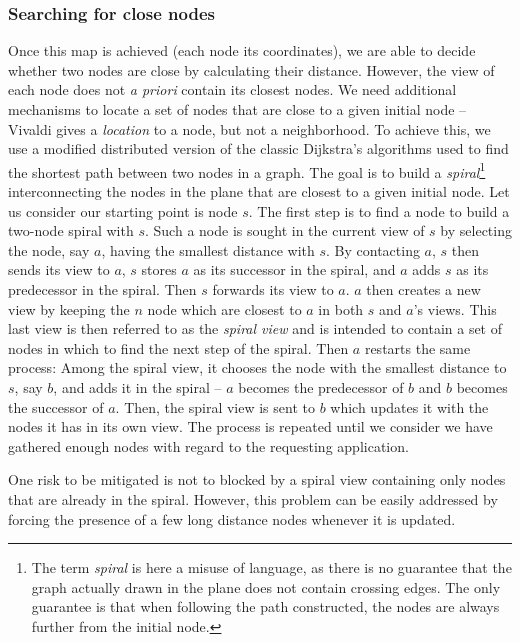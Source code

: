 \subsubsection*{Searching for close nodes}

Once this map is achieved (each node its coordinates), we are able to decide
whether two nodes are close by calculating their distance. However, the view of
each node does not \emph{a priori} contain its closest nodes. We need additional
mechanisms to locate a set of nodes that are close to a given initial node --
Vivaldi gives a \emph{location} to a node, but not a neighborhood. To achieve
this, we use a modified distributed version of the classic Dijkstra's algorithms
used to find the shortest path between two nodes in a graph. The goal is to
build a \emph{spiral}\footnote{The term \emph{spiral} is here a misuse of
language, as there is no guarantee that the graph actually drawn in the plane
does not contain crossing edges. The only guarantee is that when following the
path constructed, the nodes are always further from the initial node.}
interconnecting the nodes in the plane that are closest to a given initial
node. Let us consider our starting point is node $s$. The first step is to find
a node to build a two-node spiral with $s$. Such a node is sought in the current
view of $s$ by selecting the node, say $a$, having the smallest distance with
$s$. By contacting $a$, $s$ then sends its view to $a$, $s$ stores $a$ as its
successor in the spiral, and $a$ adds $s$ as its predecessor in the spiral. Then
$s$ forwards its view to $a$. $a$ then creates a new view by keeping the $n$
node which are closest to $a$ in both $s$ and $a$'s views. This last view is
then referred to as the \emph{spiral view} and is intended to contain a set of
nodes in which to find the next step of the spiral. Then $a$ restarts the same
process: Among the spiral view, it chooses the node with the smallest distance
to $s$, say $b$, and adds it in the spiral -- $a$ becomes the predecessor of $b$
and $b$ becomes the successor of $a$. Then, the spiral view is sent to $b$ which
updates it with the nodes it has in its own view. The process is repeated until
we consider we have gathered enough nodes with regard to the requesting
application.

One risk to be mitigated is not to blocked by a spiral view containing only
nodes that are already in the spiral. However, this problem can be easily
addressed by forcing the presence of a few long distance nodes whenever it is
updated.

